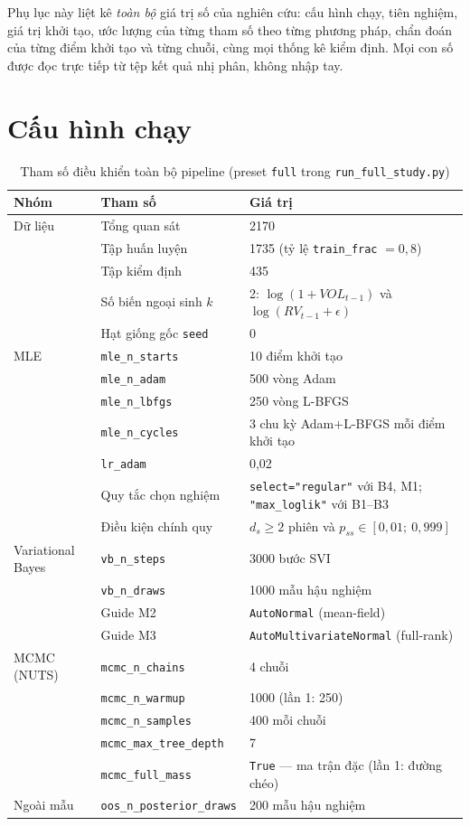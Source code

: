 \documentclass[11pt,a4paper]{article}
\begin{document}
Phụ lục này liệt kê \emph{toàn bộ} giá trị số của nghiên cứu: cấu hình chạy,
tiên nghiệm, giá trị khởi tạo, ước lượng của từng tham số theo từng phương pháp,
chẩn đoán của từng điểm khởi tạo và từng chuỗi, cùng mọi thống kê kiểm định.
Mọi con số được đọc trực tiếp từ tệp kết quả nhị phân, không nhập tay.

\section{Cấu hình chạy}

\begin{table}[H]\centering\footnotesize
\caption{Tham số điều khiển toàn bộ pipeline (preset \texttt{full} trong \texttt{run\_full\_study.py})}
\begin{tabularx}{\textwidth}{l l X}
\toprule
\textbf{Nhóm} & \textbf{Tham số} & \textbf{Giá trị} \\
\midrule
Dữ liệu & Tổng quan sát & 2170 \\
 & Tập huấn luyện & 1735 (tỷ lệ \texttt{train\_frac} $=0{,}8$) \\
 & Tập kiểm định & 435 \\
 & Số biến ngoại sinh $k$ & 2: $\log(1+VOL_{t-1})$ và $\log(RV_{t-1}+\epsilon)$ \\
 & Hạt giống gốc \texttt{seed} & 0 \\
\midrule
MLE & \texttt{mle\_n\_starts} & 10 điểm khởi tạo \\
 & \texttt{mle\_n\_adam} & 500 vòng Adam \\
 & \texttt{mle\_n\_lbfgs} & 250 vòng L-BFGS \\
 & \texttt{mle\_n\_cycles} & 3 chu kỳ Adam${+}$L-BFGS mỗi điểm khởi tạo \\
 & \texttt{lr\_adam} & 0,02 \\
 & Quy tắc chọn nghiệm & \texttt{select="regular"} với B4, M1; \texttt{"max\_loglik"} với B1--B3 \\
 & Điều kiện chính quy & $d_s \ge 2$ phiên và $p_{ss} \in [0{,}01;\ 0{,}999]$ \\
\midrule
Variational Bayes & \texttt{vb\_n\_steps} & 3000 bước SVI \\
 & \texttt{vb\_n\_draws} & 1000 mẫu hậu nghiệm \\
 & Guide M2 & \texttt{AutoNormal} (mean-field) \\
 & Guide M3 & \texttt{AutoMultivariateNormal} (full-rank) \\
\midrule
MCMC (NUTS) & \texttt{mcmc\_n\_chains} & 4 chuỗi \\
 & \texttt{mcmc\_n\_warmup} & 1000 (lần 1: 250) \\
 & \texttt{mcmc\_n\_samples} & 400 mỗi chuỗi \\
 & \texttt{mcmc\_max\_tree\_depth} & 7 \\
 & \texttt{mcmc\_full\_mass} & \texttt{True} --- ma trận đặc (lần 1: đường chéo) \\
\midrule
Ngoài mẫu & \texttt{oos\_n\_posterior\_draws} & 200 mẫu hậu nghiệm \\
\bottomrule
\end{tabularx}
\end{table}
\end{document}
